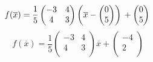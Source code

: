 \documentclass [a4paper,12pt]{article}
\begin{document}
\begin{equation*}
f({\overline{x}})= \frac{1}{5}\left(
\begin{matrix}
-3 & 4\\
4 & 3\\
\end{matrix}
\right
)
\left ( {\overline{x}} -
\left(
\begin{matrix}
0\\
5\\
\end{matrix}
\right
)
\right ) \, +
\left(
\begin{matrix}
0\\
5\\
\end{matrix}
\right
)\\
\end{equation*}
\begin{equation*}
f({\overline{x}})= \frac{1}{5}\left(
\begin{matrix}
-3 & 4\\
4 & 3\\
\end{matrix} \right )
{\overline{x}} +
\left(
\begin{matrix}
-4\\
2\\
\end{matrix}
\right
)
\end{equation*}
\end{document}
